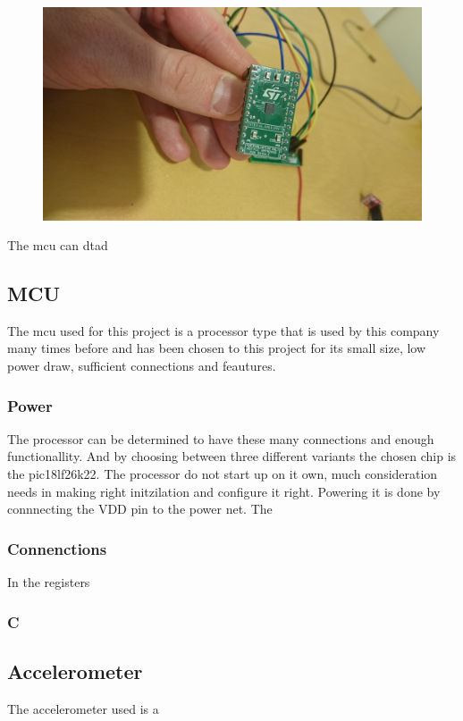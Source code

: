 \begin{figure}[H] 
\centering 
\includegraphics[width=.8\linewidth]{Figures/DSC_0103} 
\label{rattbo} 
\end{figure} 

The \gls{mcu} can dtad

\subsection{MCU}
The \gls{mcu} used for this project is a processor type that is used by this company many times before and has been chosen to this project for its small size, low power draw, sufficient connections and feautures. 
\subsubsection{Power}
The processor can be determined to have these many connections and enough functionallity. And by choosing between three different variants the chosen chip is the pic18lf26k22\cite{pic18}.
The processor do not start up on it own, much consideration needs in making right initzilation and configure it right. Powering it is done by connnecting the VDD pin to the power net. The

\subsubsection{Connenctions}
 In the registers 

\subsubsection{C}

\subsection{Accelerometer}
The accelerometer used is a 

